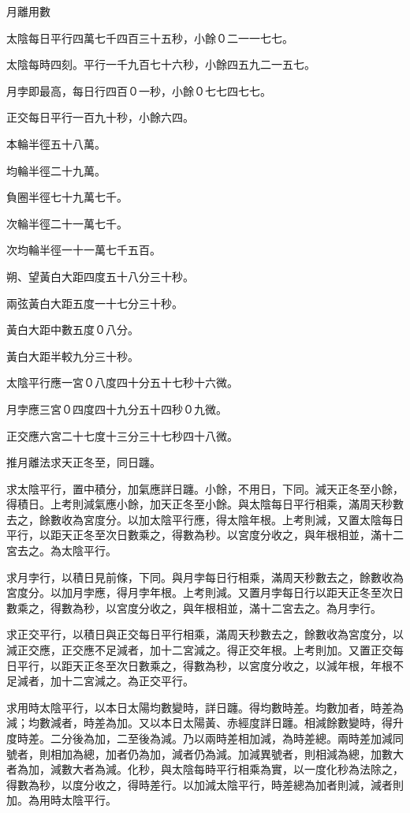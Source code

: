 \begin{pinyinscope}
月離用數

太陰每日平行四萬七千四百三十五秒，小餘０二一一七七。

太陰每時四刻。平行一千九百七十六秒，小餘四五九二一五七。

月孛即最高，每日行四百０一秒，小餘０七七四七七。

正交每日平行一百九十秒，小餘六四。

本輪半徑五十八萬。

均輪半徑二十九萬。

負圈半徑七十九萬七千。

次輪半徑二十一萬七千。

次均輪半徑一十一萬七千五百。

朔、望黃白大距四度五十八分三十秒。

兩弦黃白大距五度一十七分三十秒。

黃白大距中數五度０八分。

黃白大距半較九分三十秒。

太陰平行應一宮０八度四十分五十七秒十六微。

月孛應三宮０四度四十九分五十四秒０九微。

正交應六宮二十七度十三分三十七秒四十八微。

推月離法求天正冬至，同日躔。

求太陰平行，置中積分，加氣應詳日躔。小餘，不用日，下同。減天正冬至小餘，得積日。上考則減氣應小餘，加天正冬至小餘。與太陰每日平行相乘，滿周天秒數去之，餘數收為宮度分。以加太陰平行應，得太陰年根。上考則減，又置太陰每日平行，以距天正冬至次日數乘之，得數為秒。以宮度分收之，與年根相並，滿十二宮去之。為太陰平行。

求月孛行，以積日見前條，下同。與月孛每日行相乘，滿周天秒數去之，餘數收為宮度分。以加月孛應，得月孛年根。上考則減。又置月孛每日行以距天正冬至次日數乘之，得數為秒，以宮度分收之，與年根相並，滿十二宮去之。為月孛行。

求正交平行，以積日與正交每日平行相乘，滿周天秒數去之，餘數收為宮度分，以減正交應，正交應不足減者，加十二宮減之。得正交年根。上考則加。又置正交每日平行，以距天正冬至次日數乘之，得數為秒，以宮度分收之，以減年根，年根不足減者，加十二宮減之。為正交平行。

求用時太陰平行，以本日太陽均數變時，詳日躔。得均數時差。均數加者，時差為減；均數減者，時差為加。又以本日太陽黃、赤經度詳日躔。相減餘數變時，得升度時差。二分後為加，二至後為減。乃以兩時差相加減，為時差總。兩時差加減同號者，則相加為總，加者仍為加，減者仍為減。加減異號者，則相減為總，加數大者為加，減數大者為減。化秒，與太陰每時平行相乘為實，以一度化秒為法除之，得數為秒，以度分收之，得時差行。以加減太陰平行，時差總為加者則減，減者則加。為用時太陰平行。


\end{pinyinscope}
